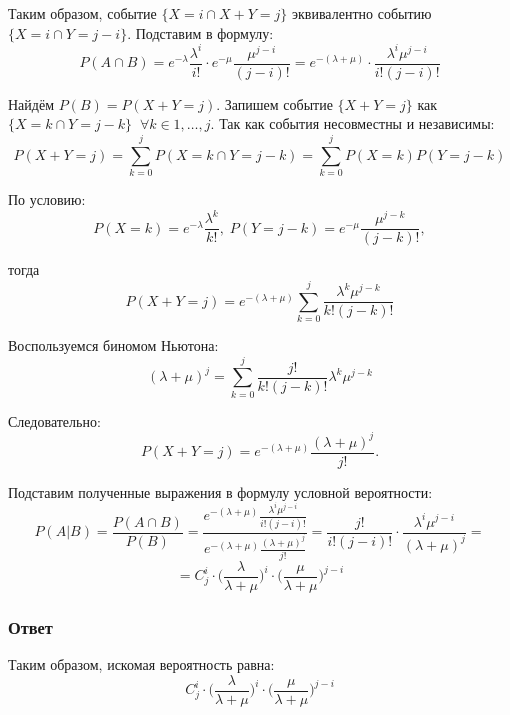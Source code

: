 \documentclass[a4paper,14pt]{extarticle}
\begin{document}
            Таким образом, событие \(\{X = i \cap X + Y = j\}\) эквивалентно событию \(\{X = i \cap Y = j - i\}\). Подставим в формулу:
            \[P(A \cap B ) =  e^{-\lambda} \frac{\lambda^i}{i!} \cdot e^{-\mu} \frac{\mu^{j-i}}{(j-i)!} = e^{-(\lambda + \mu)} \cdot \frac{\lambda^i \mu^{j-i}}{i!(j-i)!}\]
            
            Найдём \(P(B) = P(X + Y = j) \). Запишем событие \(\{X + Y = j\}\) как \(\{X = k \cap Y = j-k\} \;\; \forall k \in {1, \dots, j}\). Так как события несовместны и независимы:
            \[ P(X + Y = j) = \sum_{k=0}^{j} P(X = k \cap Y = j-k) = \sum_{k=0}^{j}P(X = k) P(Y = j - k)\]
            
            По условию:
            \[P(X = k) = e^{-\lambda} \frac{\lambda^k}{k!}, \; P(Y = j - k) = e^{-\mu} \frac{\mu^{j-k}}{(j-k)!}, \]
            
            тогда
            \[ P(X + Y = j) = e^{-(\lambda + \mu)} \sum_{k=0}^{j} \frac{\lambda^k \mu^{j-k}}{k!(j-k)!} \]
            
            Воспользуемся биномом Ньютона: \[(\lambda + \mu)^j = \sum_{k=0}^{j} \frac{j!}{k!(j-k)!} \lambda^k \mu^{j-k}\]
            
            Следовательно:
            \[P(X+Y=j) = e^{-(\lambda + \mu)} \frac{(\lambda+\mu)^j}{j!}.\]
            
            Подставим полученные выражения в формулу условной вероятности:
            \[P(A|B) = \frac{P( A \cap B)}{P(B)} = \frac{e^{-(\lambda + \mu)} \frac{\lambda^i \mu^{j-i}}{i!(j-i)!}}{e^{-(\lambda + \mu)} \frac{(\lambda+\mu)^j}{j!}} = \frac{j!}{i!(j-i)!} \cdot \frac{\lambda^i \mu^{j-i}}{(\lambda+\mu)^j} =\]
            \[ = C_j^i \cdot \big(\frac{\lambda}{\lambda+\mu}\big)^i \cdot \big(\frac{\mu}{\lambda+\mu}\big)^{j-i}\]
            
            \subsubsection*{Ответ}
                
                Таким образом, искомая вероятность равна:
                \[
                    \boxed{C_j^i \cdot \big(\frac{\lambda}{\lambda+\mu}\big)^i \cdot \big(\frac{\mu}{\lambda+\mu}\big)^{j-i}}
                \]


                
    
\end{document}

